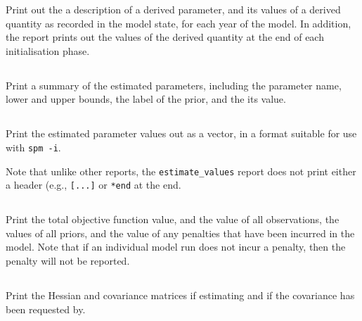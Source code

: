 Print out the a description of a derived parameter, and its values of a derived quantity as recorded in the model state, for each year of the model. In addition, the report prints out the values of the derived quantity at the end of each initialisation phase.

\subsection{}

Print a summary of the estimated parameters, including the parameter name, lower and upper bounds, the label of the prior, and the its value.

\subsection{}

Print the estimated parameter values out as a vector, in a format suitable for use with \texttt{spm -i}.

Note that unlike other reports, the \texttt{estimate\_values} report does not print either a header (e.g., \texttt{[...]} or \texttt{*end} at the end. 

\subsection{}

Print the total objective function value, and the value of all observations, the values of all priors, and the value of any penalties that have been incurred in the model. Note that if an individual model run does not incur a penalty, then the penalty will not be reported.

\subsection{}

Print the Hessian and covariance matrices if estimating and if the covariance has been requested by.

\subsection{}

